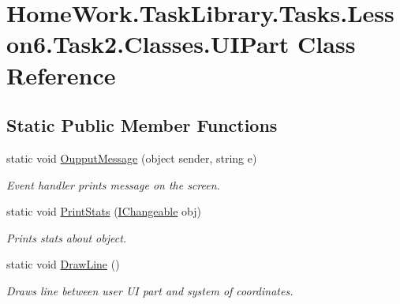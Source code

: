 \hypertarget{class_home_work_1_1_task_library_1_1_tasks_1_1_lesson6_1_1_task2_1_1_classes_1_1_u_i_part}{}\section{Home\+Work.\+Task\+Library.\+Tasks.\+Lesson6.\+Task2.\+Classes.\+U\+I\+Part Class Reference}
\label{class_home_work_1_1_task_library_1_1_tasks_1_1_lesson6_1_1_task2_1_1_classes_1_1_u_i_part}
\subsection*{Static Public Member Functions}
\begin{DoxyCompactItemize}
\item 
static void \mbox{\hyperlink{class_home_work_1_1_task_library_1_1_tasks_1_1_lesson6_1_1_task2_1_1_classes_1_1_u_i_part_a4f469576e39999e21a32ce7538061daa}{Oupput\+Message}} (object sender, string e)
\begin{DoxyCompactList}\small\item\em Event handler prints message on the screen. \end{DoxyCompactList}\item 
static void \mbox{\hyperlink{class_home_work_1_1_task_library_1_1_tasks_1_1_lesson6_1_1_task2_1_1_classes_1_1_u_i_part_a4c23729c5d9e2180678f7f6daf28961e}{Print\+Stats}} (\mbox{\hyperlink{interface_home_work_1_1_task_library_1_1_tasks_1_1_lesson6_1_1_task2_1_1_interfaces_1_1_i_changeable}{I\+Changeable}} obj)
\begin{DoxyCompactList}\small\item\em Prints stats about object. \end{DoxyCompactList}\item 
static void \mbox{\hyperlink{class_home_work_1_1_task_library_1_1_tasks_1_1_lesson6_1_1_task2_1_1_classes_1_1_u_i_part_a900dde3ec60e346b43af517d61927fba}{Draw\+Line}} ()
\begin{DoxyCompactList}\small\item\em Draws line between user UI part and system of coordinates. \end{DoxyCompactList}\end{DoxyCompactItemize}
